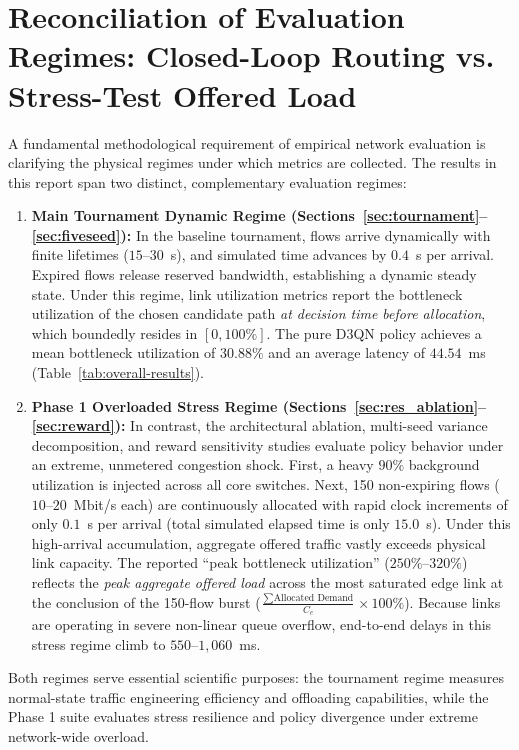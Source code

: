 \documentclass[12pt,a4paper,oneside]{report}
\begin{document}
\section{Reconciliation of Evaluation Regimes: Closed-Loop Routing vs. Stress-Test Offered Load}
\label{sec:res_regimes}
A fundamental methodological requirement of empirical network evaluation is clarifying the physical regimes under which metrics are collected. The results in this report span two distinct, complementary evaluation regimes:
\begin{enumerate}
  \item \textbf{Main Tournament Dynamic Regime (Sections~\ref{sec:tournament}--\ref{sec:fiveseed}):} In the baseline tournament, flows arrive dynamically with finite lifetimes ($15$--$30$~s), and simulated time advances by $0.4$~s per arrival. Expired flows release reserved bandwidth, establishing a dynamic steady state. Under this regime, link utilization metrics report the bottleneck utilization of the chosen candidate path \emph{at decision time before allocation}, which boundedly resides in $[0, 100\%]$. The pure D3QN policy achieves a mean bottleneck utilization of $30.88\%$ and an average latency of $44.54$~ms (Table~\ref{tab:overall-results}).
  \item \textbf{Phase 1 Overloaded Stress Regime (Sections~\ref{sec:res_ablation}--\ref{sec:reward}):} In contrast, the architectural ablation, multi-seed variance decomposition, and reward sensitivity studies evaluate policy behavior under an extreme, unmetered congestion shock. First, a heavy $90\%$ background utilization is injected across all core switches. Next, 150 non-expiring flows ($10$--$20$~Mbit/s each) are continuously allocated with rapid clock increments of only $0.1$~s per arrival (total simulated elapsed time is only $15.0$~s). Under this high-arrival accumulation, aggregate offered traffic vastly exceeds physical link capacity. The reported ``peak bottleneck utilization'' ($250\%$--$320\%$) reflects the \emph{peak aggregate offered load} across the most saturated edge link at the conclusion of the 150-flow burst ($\frac{\sum \text{Allocated Demand}}{C_e} \times 100\%$). Because links are operating in severe non-linear queue overflow, end-to-end delays in this stress regime climb to $550$--$1,060$~ms.
\end{enumerate}
Both regimes serve essential scientific purposes: the tournament regime measures normal-state traffic engineering efficiency and offloading capabilities, while the Phase 1 suite evaluates stress resilience and policy divergence under extreme network-wide overload.
\end{document}
